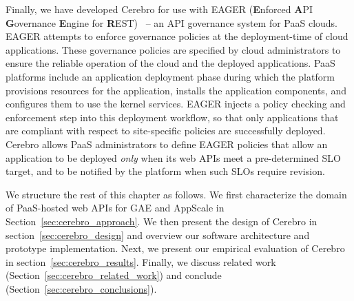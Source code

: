 Finally, we have developed Cerebro for use with EAGER (\textbf{E}nforced
\textbf{A}PI \textbf{G}overnance \textbf{E}ngine for
\textbf{R}EST)~\cite{eager-fop15} --
an API governance system for PaaS clouds. EAGER attempts to enforce
governance policies at the deployment-time of cloud applications. These governance
policies are specified by cloud administrators to ensure the reliable
operation of the cloud and the deployed applications. PaaS
platforms include an application deployment phase during which the platform provisions
resources for the application, installs the application components, and
configures them to use the kernel services. EAGER injects a policy checking and
enforcement step into this deployment workflow, so that only applications that
are compliant with respect to site-specific policies are successfully deployed. 
Cerebro allows PaaS administrators to define
EAGER policies that allow an application to be deployed \textit{only} when its
web APIs meet a pre-determined SLO target, and to be
notified by the platform when such SLOs require revision.

We structure the rest of this chapter as follows.
We first characterize the domain of 
PaaS-hosted web APIs for GAE and AppScale 
in Section~\ref{sec:cerebro_approach}.   
We then present the design of Cerebro in section~\ref{sec:cerebro_design}
and overview our software architecture and prototype implementation.
Next, we
present our empirical evaluation of Cerebro in 
section~\ref{sec:cerebro_results}.
Finally,  we discuss related work (Section~\ref{sec:cerebro_related_work}) and 
conclude (Section~\ref{sec:cerebro_conclusions}).
